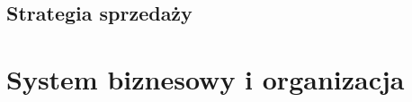 \documentclass[12pt]{article}
\begin{document}

\subsection{Strategia sprzedaży}





\section{System biznesowy i organizacja}


\end{document}
